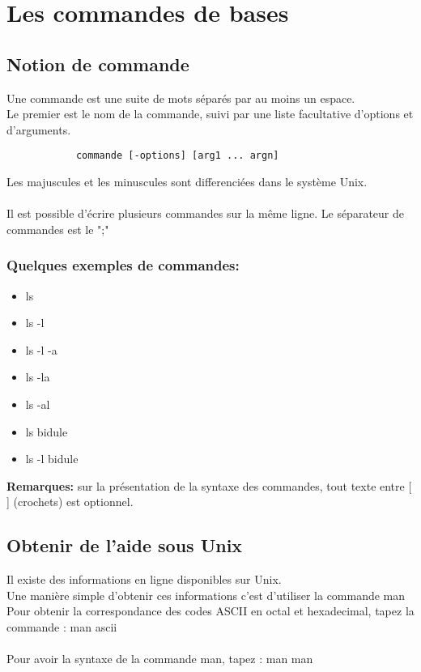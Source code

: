 \part{Les commandes de bases}
	\chapter{Notion de commande}
		Une commande est une suite de mots séparés par au moins un espace.\\
		Le premier est le nom de la commande, suivi par une liste facultative d'options et d'arguments.
		\begin{verbatim}	
			commande [-options] [arg1 ... argn]
		\end{verbatim}
		Les majuscules et les minuscules  sont differenciées dans le système Unix.\\ \\

		Il est possible d'écrire plusieurs commandes sur la même ligne. Le séparateur de commandes est le ";"

		\section{Quelques exemples de commandes: }
			\begin{itemize}
				\item ls
				\item ls -l
				\item ls -l -a
				\item ls -la
				\item ls -al
				\item ls bidule
				\item ls -l bidule
			\end{itemize}
		\textbf{Remarques:} sur la présentation de la syntaxe des commandes, tout texte entre [ ] (crochets) est optionnel.
	\chapter{Obtenir de l'aide sous Unix}
		Il existe des informations  en ligne disponibles sur Unix.\\
		Une manière simple d'obtenir ces informations c'est d'utiliser la commande man\\
		Pour obtenir la correspondance des codes ASCII en octal et hexadecimal, tapez la commande : man ascii \\ \\

		Pour avoir la syntaxe de la commande man, tapez : man man 
